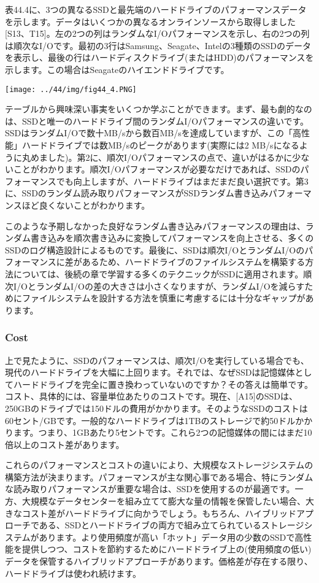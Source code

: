 表44.4に、3つの異なるSSDと最先端のハードドライブのパフォーマンスデータを示します。データはいくつかの異なるオンラインソースから取得しました{[}S13、T15{]}。左の2つの列はランダムなI/Oパフォーマンスを示し、右の2つの列は順次なI/Oです。最初の3行はSamsung、Seagate、Intelの3種類のSSDのデータを表示し、最後の行はハードディスクドライブ(またはHDD)のパフォーマンスを示します。この場合はSeagateのハイエンドドライブです。

\texttt{[image: ../44/img/fig44\_4.PNG]}

テーブルから興味深い事実をいくつか学ぶことができます。まず、最も劇的なのは、SSDと唯一のハードドライブ間のランダムI/Oパフォーマンスの違いです。SSDはランダムI/Oで数十MB/sから数百MB/sを達成していますが、この「高性能」ハードドライブでは数MB/sのピークがあります(実際には2
MB/sになるように丸めました)。第2に、順次I/Oパフォーマンスの点で、違いがはるかに少ないことがわかります。順次I/Oパフォーマンスが必要なだけであれば、SSDのパフォーマンスでも向上しますが、ハードドライブはまだまだ良い選択です。第3に、SSDのランダム読み取りパフォーマンスがSSDランダム書き込みパフォーマンスほど良くないことがわかります。

このような予期しなかった良好なランダム書き込みパフォーマンスの理由は、ランダム書き込みを順次書き込みに変換してパフォーマンスを向上させる、多くのSSDのログ構造設計によるものです。最後に、SSDは順次I/OとランダムI/Oのパフォーマンスに差があるため、ハードドライブのファイルシステムを構築する方法については、後続の章で学習する多くのテクニックがSSDに適用されます。順次I/OとランダムI/Oの差の大きさは小さくなりますが、ランダムI/Oを減らすためにファイルシステムを設計する方法を慎重に考慮するには十分なギャップがあります。

\hypertarget{cost}{%
\subsubsection*{Cost}\label{cost}}

上で見たように、SSDのパフォーマンスは、順次I/Oを実行している場合でも、現代のハードドライブを大幅に上回ります。それでは、なぜSSDは記憶媒体としてハードドライブを完全に置き換わっていないのですか？その答えは簡単です。コスト、具体的には、容量単位あたりのコストです。現在、{[}A15{]}のSSDは、250GBのドライブでは150ドルの費用がかかります。そのようなSSDのコストは60セント/GBです。一般的なハードドライブは1TBのストレージで約50ドルかかります。つまり、1GBあたり5セントです。これら2つの記憶媒体の間にはまだ10倍以上のコスト差があります。

これらのパフォーマンスとコストの違いにより、大規模なストレージシステムの構築方法が決まります。パフォーマンスが主な関心事である場合、特にランダムな読み取りパフォーマンスが重要な場合は、SSDを使用するのが最適です。一方、大規模なデータセンターを組み立てて膨大な量の情報を保管したい場合、大きなコスト差がハードドライブに向かうでしょう。もちろん、ハイブリッドアプローチである、SSDとハードドライブの両方で組み立てられているストレージシステムがあります。より使用頻度が高い「ホット」データ用の少数のSSDで高性能を提供しつつ、コストを節約するためにハードドライブ上の(使用頻度の低い)データを保管するハイブリッドアプローチがあります。価格差が存在する限り、ハードドライブは使われ続けます。


